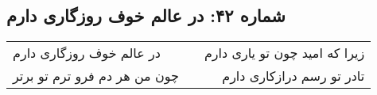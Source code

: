 \begin{center}
\section*{شماره ۴۲: در عالم خوف روزگاری دارم}
\label{sec:042}
\begin{longtable}{l p{0.5cm} r}
در عالم خوف روزگاری دارم
&&
زیرا که امید چون تو یاری دارم
\\
چون من هر دم فرو ترم تو برتر
&&
تادر تو رسم درازکاری دارم
\\
\end{longtable}
\end{center}
